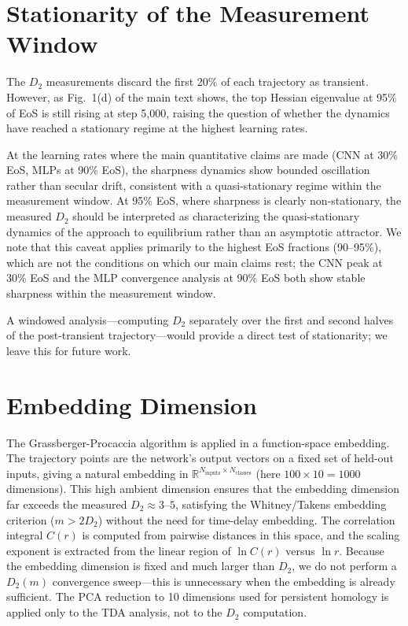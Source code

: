 \documentclass[aps,prl,twocolumn,superscriptaddress,floatfix]{revtex4-2}
\begin{document}
\section{Stationarity of the Measurement Window}

The $D_2$ measurements discard the first 20\% of each trajectory as transient. However, as Fig.~1(d) of the main text shows, the top Hessian eigenvalue at 95\% of EoS is still rising at step 5{,}000, raising the question of whether the dynamics have reached a stationary regime at the highest learning rates.

At the learning rates where the main quantitative claims are made (CNN at 30\% EoS, MLPs at 90\% EoS), the sharpness dynamics show bounded oscillation rather than secular drift, consistent with a quasi-stationary regime within the measurement window. At 95\% EoS, where sharpness is clearly non-stationary, the measured $D_2$ should be interpreted as characterizing the quasi-stationary dynamics of the approach to equilibrium rather than an asymptotic attractor. We note that this caveat applies primarily to the highest EoS fractions (90--95\%), which are not the conditions on which our main claims rest; the CNN peak at 30\% EoS and the MLP convergence analysis at 90\% EoS both show stable sharpness within the measurement window.

A windowed analysis---computing $D_2$ separately over the first and second halves of the post-transient trajectory---would provide a direct test of stationarity; we leave this for future work.

\section{Embedding Dimension}

The Grassberger-Procaccia algorithm is applied in a function-space embedding. The trajectory points are the network's output vectors on a fixed set of held-out inputs, giving a natural embedding in $\mathbb{R}^{N_\text{inputs} \times N_\text{classes}}$ (here $100 \times 10 = 1000$ dimensions). This high ambient dimension ensures that the embedding dimension far exceeds the measured $D_2 \approx 3$--$5$, satisfying the Whitney/Takens embedding criterion ($m > 2D_2$) without the need for time-delay embedding. The correlation integral $C(r)$ is computed from pairwise distances in this space, and the scaling exponent is extracted from the linear region of $\ln C(r)$ versus $\ln r$. Because the embedding dimension is fixed and much larger than $D_2$, we do not perform a $D_2(m)$ convergence sweep---this is unnecessary when the embedding is already sufficient. The PCA reduction to 10 dimensions used for persistent homology is applied only to the TDA analysis, not to the $D_2$ computation.
\end{document}
